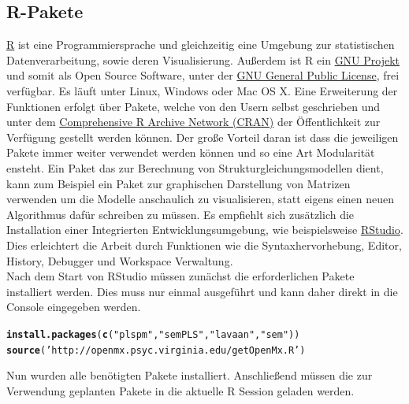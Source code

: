 \documentclass{article}\usepackage[]{graphicx}\usepackage[]{color}
\makeatletter
\newcommand{\hlstr}[1]{\textcolor[rgb]{0.192,0.494,0.8}{#1}}%
\newcommand{\hlstd}[1]{\textcolor[rgb]{0.345,0.345,0.345}{#1}}%
\newcommand{\hlkwd}[1]{\textcolor[rgb]{0.737,0.353,0.396}{\textbf{#1}}}%
\newenvironment{kframe}{%
 \def\at@end@of@kframe{}%
 \ifinner\ifhmode%
  \def\at@end@of@kframe{\end{minipage}}%
  \begin{minipage}{\columnwidth}%
 \fi\fi%
 \def\FrameCommand##1{\hskip\@totalleftmargin \hskip-\fboxsep
 \colorbox{shadecolor}{##1}\hskip-\fboxsep
     \hskip-\linewidth \hskip-\@totalleftmargin \hskip\columnwidth}%
 \MakeFramed {\advance\hsize-\width
   \@totalleftmargin\z@ \linewidth\hsize
   \@setminipage}}%
 {\par\unskip\endMakeFramed%
 \at@end@of@kframe}
\newenvironment{knitrout}{}{} %
\makeatother
\begin{document}
\subsection{R-Pakete}
\href{http://www.r-project.org/}{R} ist eine Programmiersprache und gleichzeitig eine Umgebung zur statistischen Datenverarbeitung, sowie deren Visualisierung. Außerdem ist R ein \href{http://www.gnu.org/}{GNU Projekt} und somit als Open Source Software, unter der \href{http://www.r-project.org/COPYING}{GNU General Public License}, frei verfügbar. Es läuft unter Linux, Windows oder Mac OS X. Eine Erweiterung der Funktionen erfolgt über Pakete, welche von den Usern selbst geschrieben und unter dem \href{http://cran.r-project.org/}{Comprehensive R Archive Network (CRAN)} der Öffentlichkeit zur Verfügung gestellt werden können. Der große Vorteil daran ist dass die jeweiligen Pakete immer weiter verwendet werden können und so eine Art Modularität ensteht. Ein Paket das zur Berechnung von Strukturgleichungsmodellen dient, kann zum Beispiel ein Paket zur graphischen Darstellung von Matrizen verwenden um die Modelle anschaulich zu visualisieren, statt eigens einen neuen Algorithmus dafür schreiben zu müssen. Es empfiehlt sich zusätzlich die Installation einer Integrierten Entwicklungsumgebung, wie beispielsweise \href{http://www.rstudio.com/}{RStudio}. Dies erleichtert die Arbeit durch Funktionen wie die Syntaxhervorhebung, Editor, History, Debugger und Workspace Verwaltung.\\
Nach dem Start von RStudio müssen zunächst die erforderlichen Pakete installiert werden. Dies muss nur einmal ausgeführt und kann daher direkt in die Console eingegeben werden.

\begin{knitrout}
\color{fgcolor}\begin{kframe}
\begin{alltt}
\hlkwd{install.packages}\hlstd{(}\hlkwd{c}\hlstd{(}\hlstr{"plspm"}\hlstd{,}\hlstr{"semPLS"}\hlstd{,}\hlstr{"lavaan"}\hlstd{,}\hlstr{"sem"}\hlstd{))}
\hlkwd{source}\hlstd{(}\hlstr{'http://openmx.psyc.virginia.edu/getOpenMx.R'}\hlstd{)}
\end{alltt}
\end{kframe}
\end{knitrout}
Nun wurden alle benötigten Pakete installiert. Anschließend müssen die zur Verwendung geplanten Pakete in die aktuelle R Session geladen werden.
\end{document}
